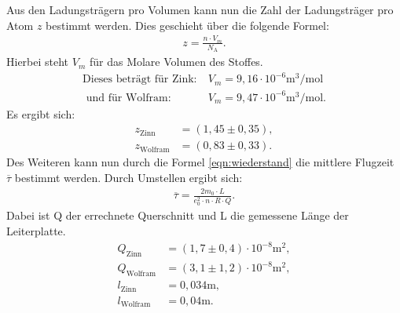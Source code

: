 Aus den Ladungsträgern pro Volumen kann nun die Zahl der Ladungsträger pro Atom $z$
bestimmt werden. Dies geschieht über die folgende Formel:
\begin{align}
  z=\frac{n \cdot V_m}{N_\mathrm{A}}.
\end{align}
Hierbei steht $V_m$ für das Molare Volumen des Stoffes.
\begin{align*}
\text{Dieses beträgt für Zink:}& \ V_m=9,16\cdot10^{-6}\si{\meter\tothe{3}\per\mol}\\
\text{ und für Wolfram}:& \ V_m=9,47\cdot10^{-6}\si{\meter\tothe{3}\per\mol}.
\end{align*}
Es ergibt sich:
\begin{align}
z_\mathrm{Zinn}&=(1,45\pm0,35),\\ %
z_\mathrm{Wolfram}&=(0,83\pm0,33).
\end{align}
Des Weiteren kann nun durch die Formel \eqref{eqn:wiederstand} die mittlere
Flugzeit $\overline\tau$ bestimmt werden. Durch Umstellen ergibt sich:
\begin{align}
  \overline{\tau}=\frac{2m_0\cdot L}{e_0^2 \cdot n \cdot R \cdot Q}.
\end{align}
Dabei ist Q der errechnete Querschnitt und L die gemessene Länge der Leiterplatte.
\begin{align*}
  Q_\mathrm{Zinn}&=(1,7\pm0,4)\cdot10^{-8}\si{\square\meter},\\
  Q_\mathrm{Wolfram}&=(3,1\pm1,2)\cdot10^{-8}\si{\square\meter},\\
l_\mathrm{Zinn}&=0,034\si{\meter},\\
l_\mathrm{Wolfram}&=0,04\si{\meter}.\\
\end{align*}

